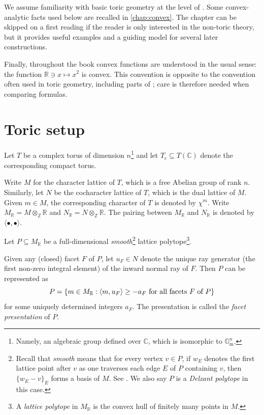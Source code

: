 We assume familiarity with basic toric geometry at the level of \cite{CLS11}. Some convex-analytic facts used below are recalled in \cref{chap:convex}. The chapter can be skipped on a first reading if the reader is only interested in the non-toric theory, but it provides useful examples and a guiding model for several later constructions.

Finally, throughout the book convex functions are understood in the usual sense: the function $\mathbb R\ni x\mapsto x^2$ is convex. This convention is opposite to the convention often used in toric geometry, including parts of \cite{CLS11}; care is therefore needed when comparing formulas.

\section{Toric setup}\label{sec:toricsetup}
Let $T$ be a complex torus of dimension $n$\footnote{Namely, an algebraic group defined over $\mathbb{C}$, which is isomorphic to $\mathbb{G}_{\mathrm{m}}^n$.} and let $T_c\subseteq T(\mathbb{C})$ denote the corresponding compact torus.

Write $M$ for the character lattice of $T$, which is a free Abelian group of rank $n$. Similarly, let $N$ be the cocharacter lattice of $T$, which is the dual lattice of $M$. Given $m\in M$, the corresponding character of $T$ is denoted by $\chi^m$.
Write $M_{\mathbb{R}}=M\otimes_{\mathbb{Z}} \mathbb{R}$ and $N_{\mathbb{R}}=N\otimes_{\mathbb{Z}}\mathbb{R}$. The pairing between $M_{\mathbb{R}}$ and $N_{\mathbb{R}}$ is denoted by $\langle \bullet,\bullet \rangle$.

Let $P\subseteq M_{\mathbb{R}}$ be a full-dimensional \emph{smooth}\footnote{Recall that \emph{smooth} means that for every vertex $v\in P$, if $w_E$ denotes the first lattice point after $v$ as one traverses each edge $E$ of $P$ containing $v$, then $\{w_E-v\}_E$ forms a basis of $M$. See \cite[Definition~2.4.2]{CLS11}. We also say $P$ is a \emph{Delzant polytope} in this case.} lattice polytope\footnote{A \emph{lattice polytope} in $M_{\mathbb{R}}$ is the convex hull of finitely many points in $M$.}.

Given any (closed) facet $F$ of $P$, let $u_F\in N$ denote the unique ray generator (the first non-zero integral element) of the inward normal ray of $F$. Then $P$ can be represented as
\begin{equation}\label{eq:Pfacetrep}
P=\left\{m\in M_{\mathbb{R}}: \langle m,u_F \rangle\geq -a_F\textup{ for all facets }F\textup{ of } P\right\}
\end{equation}
for some uniquely determined integers $a_F$. The presentation is called the \emph{facet presentation} of $P$.


